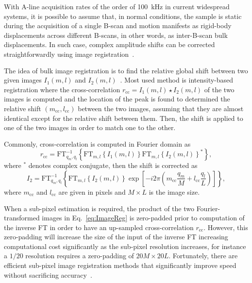 With A-line acquisition rates of the order of 100~kHz in current widespread systems, it is possible to assume that, in normal conditions, the sample is static during the acquisition of a single B-scan and motion manifests as rigid-body displacements across different B-scans, in other words, as inter-B-scan bulk displacements. In such case, complex amplitude shifts can be corrected straightforwardly using image registration~\cite{Zawadzki2007_Correction}.

The idea of bulk image registration is to find the relative global shift between two given images $I_1(m,l)$ and $I_2(m,l)$~\cite{Guizar-Sicairos2008_Efficient}. Most used method is intensity-based registration where the cross-correlation $r_{\text{cc}} = I_1(m,l)\star I_2(m,l)$ of the two images is computed and the location of the peak is found to determined the relative shift $(m_{\text{cc}}, l_{\text{cc}})$ between the two images, assuming that they are almost identical except for the relative shift between them. Then, the shift is applied to one of the two images in order to match one to the other.

Commonly, cross-correlation is computed in Fourier domain as 
\begin{equation}\label{eq:ImageReg}
    r_{\text{cc}} = \text{FT}^{-1}_{q_m,q_l}\left\{\text{FT}_{m,l}\left\{I_1(m,l)\right\}\text{FT}_{m,l}\left\{I_2(m,l)\right\}^\ast\right\},
\end{equation}
where $^\ast$ denotes complex conjugate, then the shift is corrected as
\begin{equation}
    I_2 = \text{FT}^{-1}_{q_m,q_l}\left\{\text{FT}_{m,l}\left\{I_2(m,l)\right\} \exp\left[-i2\pi\left(m_{\text{cc}} \frac{q_m}{M} + l_{\text{cc}} \frac{q_l}{L}\right)\right]\right\},
\end{equation}
where $m_{\text{cc}}$ and $l_{\text{cc}}$ are given in pixels and $M\times L$ is the image size.

When a sub-pixel estimation is required, the product of the two Fourier-transformed images in Eq.~\eqref{eq:ImageReg} is zero-padded prior to computation of the inverse FT in order to have an up-sampled cross-correlation $r_{\text{cc}}$. However, this zero-padding will increase the size of the input of the inverse FT increasing computational cost significantly as the sub-pixel resolution increases, for instance a $1/20$ resolution requires a zero-padding of $20M\times 20L$. Fortunately, there are efficient sub-pixel image registration methods that significantly improve speed without sacrificing accuracy~\cite{Guizar-Sicairos2008_Efficient}.

